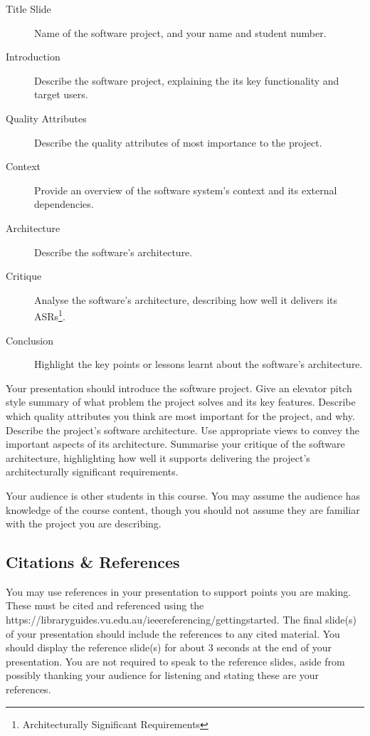 \documentclass{csse4400}
\begin{document}
\begin{description}
    \item[Title Slide] Name of the software project, and your name and student number.
    \item[Introduction] Describe the software project, explaining the its key functionality and target users.
    \item[Quality Attributes] Describe the quality attributes of most importance to the project.
    \item[Context] Provide an overview of the software system's context and its external dependencies.
    \item[Architecture] Describe the software's architecture.
    \item[Critique] Analyse the software's architecture, describing how well it delivers its ASRs\footnote{Architecturally Significant Requirements}.
    \item[Conclusion] Highlight the key points or lessons learnt about the software's architecture.
\end{description}

Your presentation should introduce the software project.
Give an elevator pitch style summary of what problem the project solves and its key features.
Describe which quality attributes you think are most important for the project, and why.
Describe the project's software architecture.
Use appropriate views \cite{view-notes} to convey the important aspects of its architecture.
Summarise your critique of the software architecture, highlighting how well it supports delivering the project's architecturally significant requirements.

Your audience is other students in this course. You may assume the audience has knowledge of the course content,
though you should not assume they are familiar with the project you are describing.

\subsection{Citations \& References}
You may use references in your presentation to support points you are making.
These must be cited and referenced using the 
{https://libraryguides.vu.edu.au/ieeereferencing/gettingstarted}.
The final slide(s) of your presentation should include the references to any cited material.
You should display the reference slide(s) for about 3 seconds at the end of your presentation.
You are not required to speak to the reference slides,
aside from possibly thanking your audience for listening and stating these are your references.
\end{document}
